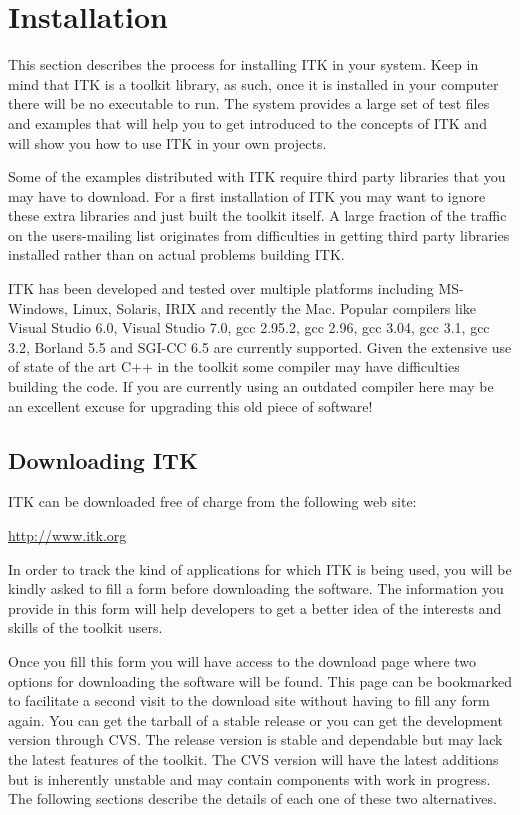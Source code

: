 \chapter{Installation}
\label{chapter:Installation}


This section describes the process for installing ITK in your system. Keep in
mind that ITK is a toolkit library, as such, once it is installed in your
computer there will be no executable to run. The system provides a large set
of test files and examples that will help you to get introduced to the
concepts of ITK and will show you how to use ITK in your own projects.

Some of the examples distributed with ITK require third party libraries that
you may have to download. For a first installation of ITK you may want to
ignore these extra libraries and just built the toolkit itself. A large
fraction of the traffic on the users-mailing list originates from
difficulties in getting third party libraries installed rather than on actual
problems building ITK.

ITK has been developed and tested over multiple platforms including
MS-Windows, Linux, Solaris, IRIX and recently the Mac. Popular compilers like
Visual Studio 6.0, Visual Studio 7.0, gcc 2.95.2, gcc 2.96, gcc 3.04, gcc
3.1, gcc 3.2, Borland 5.5 and SGI-CC 6.5 are currently supported. Given the
extensive use of state of the art C++ in the toolkit some compiler may have
difficulties building the code. If you are currently using an outdated
compiler here may be an excellent excuse for upgrading this old piece of
software!

\section{Downloading ITK}
\label{sec:DownloadingITK}
 

ITK can be downloaded free of charge from the following web site:
\begin{center} 
  \url{http://www.itk.org}
\end{center}
In order to track the kind of applications for which ITK is being used, you
will be kindly asked to fill a form before downloading the software.
The information you provide in this form will help developers to get a better
idea of the interests and skills of the toolkit users. 

Once you fill this form you will have access to the download page where two
options for downloading the software will be found. This page can be bookmarked
to facilitate a second visit to the download site without having to fill any
form again. You can get the tarball of a stable release or you can get the
development version through CVS.  The release version is stable and dependable
but may lack the latest features of the toolkit. The CVS version will have the
latest additions but is inherently unstable and may contain components with
work in progress.  The following sections describe the details of each one of
these two alternatives.

